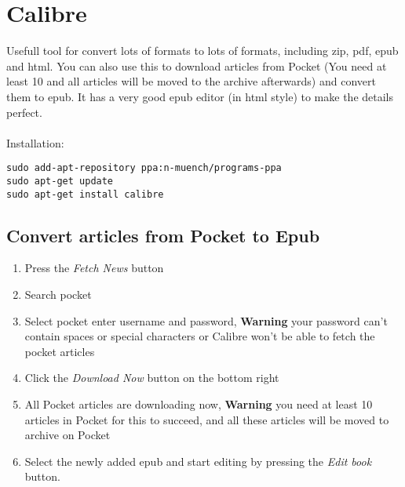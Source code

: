\documentclass[a4paper]{article}
\begin{document}
\section{Calibre}
Usefull tool for convert lots of formats to lots of formats, including zip, pdf, epub and html. You can also use this to download articles from Pocket (You need at least 10 and all articles will be moved to the archive afterwards) and convert them to epub. It has a very good epub editor (in html style) to make the details perfect.
\\
\\
Installation:
\begin{lstlisting}
sudo add-apt-repository ppa:n-muench/programs-ppa
sudo apt-get update
sudo apt-get install calibre
\end{lstlisting}
\subsection{Convert articles from Pocket to Epub}
\begin{enumerate}
\item Press the \emph{Fetch News} button
\item Search pocket
\item Select pocket enter username and password, \textbf{Warning} your password can't contain spaces or special characters or Calibre won't be able to fetch the pocket articles
\item Click the \emph{Download Now} button on the bottom right
\item All Pocket articles are downloading now, \textbf{Warning} you need at least 10 articles in Pocket for this to succeed, and all these articles will be moved to archive on Pocket
\item Select the newly added epub and start editing by pressing the \emph{Edit book} button.
\end{enumerate}
\end{document}
